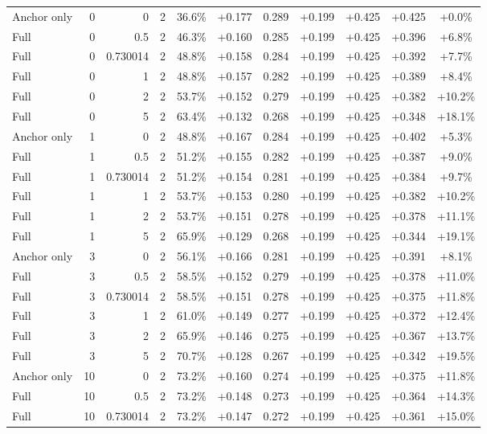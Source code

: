 \begin{table}[htbp]
\begin{tabular}{lrrrccccccc}
Anchor only & 0 & 0 & 2 & 36.6\% & +0.177 & 0.289 & +0.199 & +0.425 & +0.425 & +0.0\% \\
Full & 0 & 0.5 & 2 & 46.3\% & +0.160 & 0.285 & +0.199 & +0.425 & +0.396 & +6.8\% \\
Full & 0 & 0.730014 & 2 & 48.8\% & +0.158 & 0.284 & +0.199 & +0.425 & +0.392 & +7.7\% \\
Full & 0 & 1 & 2 & 48.8\% & +0.157 & 0.282 & +0.199 & +0.425 & +0.389 & +8.4\% \\
Full & 0 & 2 & 2 & 53.7\% & +0.152 & 0.279 & +0.199 & +0.425 & +0.382 & +10.2\% \\
Full & 0 & 5 & 2 & 63.4\% & +0.132 & 0.268 & +0.199 & +0.425 & +0.348 & +18.1\% \\
Anchor only & 1 & 0 & 2 & 48.8\% & +0.167 & 0.284 & +0.199 & +0.425 & +0.402 & +5.3\% \\
Full & 1 & 0.5 & 2 & 51.2\% & +0.155 & 0.282 & +0.199 & +0.425 & +0.387 & +9.0\% \\
Full & 1 & 0.730014 & 2 & 51.2\% & +0.154 & 0.281 & +0.199 & +0.425 & +0.384 & +9.7\% \\
Full & 1 & 1 & 2 & 53.7\% & +0.153 & 0.280 & +0.199 & +0.425 & +0.382 & +10.2\% \\
Full & 1 & 2 & 2 & 53.7\% & +0.151 & 0.278 & +0.199 & +0.425 & +0.378 & +11.1\% \\
Full & 1 & 5 & 2 & 65.9\% & +0.129 & 0.268 & +0.199 & +0.425 & +0.344 & +19.1\% \\
Anchor only & 3 & 0 & 2 & 56.1\% & +0.166 & 0.281 & +0.199 & +0.425 & +0.391 & +8.1\% \\
Full & 3 & 0.5 & 2 & 58.5\% & +0.152 & 0.279 & +0.199 & +0.425 & +0.378 & +11.0\% \\
Full & 3 & 0.730014 & 2 & 58.5\% & +0.151 & 0.278 & +0.199 & +0.425 & +0.375 & +11.8\% \\
Full & 3 & 1 & 2 & 61.0\% & +0.149 & 0.277 & +0.199 & +0.425 & +0.372 & +12.4\% \\
Full & 3 & 2 & 2 & 65.9\% & +0.146 & 0.275 & +0.199 & +0.425 & +0.367 & +13.7\% \\
Full & 3 & 5 & 2 & 70.7\% & +0.128 & 0.267 & +0.199 & +0.425 & +0.342 & +19.5\% \\
Anchor only & 10 & 0 & 2 & 73.2\% & +0.160 & 0.274 & +0.199 & +0.425 & +0.375 & +11.8\% \\
Full & 10 & 0.5 & 2 & 73.2\% & +0.148 & 0.273 & +0.199 & +0.425 & +0.364 & +14.3\% \\
Full & 10 & 0.730014 & 2 & 73.2\% & +0.147 & 0.272 & +0.199 & +0.425 & +0.361 & +15.0\% \\

\end{tabular}
\end{table}
